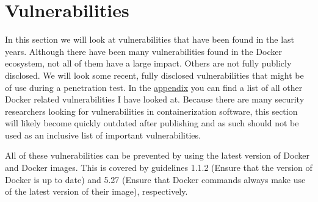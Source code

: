 \section{Vulnerabilities}\label{section:vulnerabilities}
In this section we will look at vulnerabilities that have been found in the last years. Although there have been many vulnerabilities found in the Docker ecosystem, not all of them have a large impact. Others are not fully publicly disclosed. We will look some recent, fully disclosed vulnerabilities that might be of use during a penetration test. In the \hyperref[appendix:CVE-List]{appendix} you can find a list of all other Docker related vulnerabilities I have looked at.
Because there are many security researchers looking for vulnerabilities in containerization software, this section will likely become quickly outdated after publishing and as such should not be used as an inclusive list of important vulnerabilities.

\hfill

All of these vulnerabilities can be prevented by using the latest version of Docker and Docker images. This is covered by guidelines 1.1.2 (Ensure that the version of Docker is up to date) and 5.27 (Ensure that Docker commands always make use of the latest version of their image), respectively.








